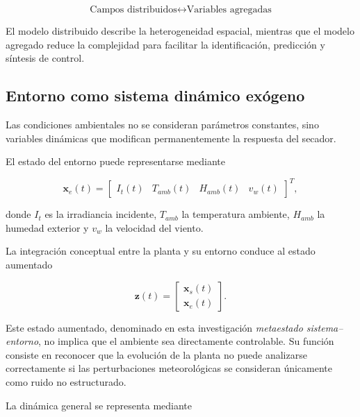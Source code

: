 \begin{equation}
\boxed{
\text{Campos distribuidos}
\longleftrightarrow
\text{Variables agregadas}
}
\end{equation}

El modelo distribuido describe la heterogeneidad espacial, mientras que el modelo agregado reduce la complejidad para facilitar la identificación, predicción y síntesis de control.

\subsection{Entorno como sistema dinámico exógeno}
\label{subsec:entorno_dinamico}

Las condiciones ambientales no se consideran parámetros constantes, sino variables dinámicas que modifican permanentemente la respuesta del secador.

El estado del entorno puede representarse mediante

\begin{equation}
\mathbf{x}_e(t)
=
\begin{bmatrix}
I_t(t) &
T_{amb}(t) &
H_{amb}(t) &
v_w(t)
\end{bmatrix}^{T},
\label{eq:estado_entorno}
\end{equation}

donde $I_t$ es la irradiancia incidente, $T_{amb}$ la temperatura ambiente, $H_{amb}$ la humedad exterior y $v_w$ la velocidad del viento.

La integración conceptual entre la planta y su entorno conduce al estado aumentado

\begin{equation}
\boxed{
\mathbf{z}(t)
=
\begin{bmatrix}
\mathbf{x}_s(t)\\
\mathbf{x}_e(t)
\end{bmatrix}.
}
\label{eq:metaestado}
\end{equation}

Este estado aumentado, denominado en esta investigación \textit{metaestado sistema--entorno}, no implica que el ambiente sea directamente controlable. Su función consiste en reconocer que la evolución de la planta no puede analizarse correctamente si las perturbaciones meteorológicas se consideran únicamente como ruido no estructurado.

La dinámica general se representa mediante

